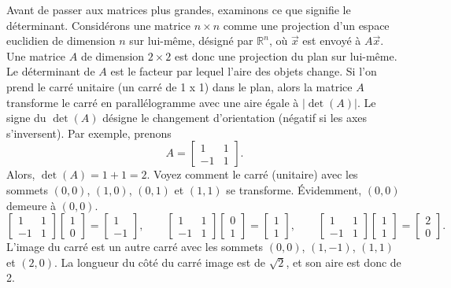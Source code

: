Avant de passer aux matrices plus grandes, examinons ce que signifie le déterminant. Considérons une matrice $n \times n$
comme une projection d'un espace euclidien de dimension $n$ sur lui-même, désigné par ${\mathbb{R}}^n$, où $\vec{x}$ est envoyé à $A \vec{x}$.
Une matrice $A$ de dimension $2 \times 2$ est donc une projection du plan sur lui-même. Le déterminant de 
$A$ est le facteur par lequel l'aire des objets change. Si l'on prend le carré unitaire (un carré de 1 x 1) dans le plan, alors la matrice
$A$ transforme le carré en parallélogramme avec une aire égale à $\lvert\det(A)\rvert$. Le signe
du $\det(A)$ désigne le changement d'orientation (négatif si les axes s'inversent). Par exemple, prenons
\begin{equation*}
A =
\begin{bmatrix}
1 & 1 \\
-1 & 1
\end{bmatrix} .
\end{equation*}
Alors, $\det(A) = 1+1 = 2$. Voyez comment le carré (unitaire) avec les sommets
$(0,0)$, $(1,0)$, $(0,1)$ et $(1,1)$ se transforme. Évidemment, $(0,0)$ demeure à $(0,0)$. 
\begin{equation*}
\begin{bmatrix}
1 & 1 \\
-1 & 1
\end{bmatrix}
\begin{bmatrix}
1 \\ 0
\end{bmatrix} =
\begin{bmatrix}
1 \\
-1 
\end{bmatrix}
,
\qquad
\begin{bmatrix}
1 & 1 \\
-1 & 1
\end{bmatrix}
\begin{bmatrix}
0 \\ 1
\end{bmatrix} =
\begin{bmatrix}
1 \\
1 
\end{bmatrix}
,
\qquad
\begin{bmatrix}
1 & 1 \\
-1 & 1
\end{bmatrix}
\begin{bmatrix}
1 \\ 1
\end{bmatrix} =
\begin{bmatrix}
2 \\
0 
\end{bmatrix}
.
\end{equation*}
L'image du carré est un autre carré avec les sommets $(0,0)$, $(1,-1)$,
$(1,1)$ et $(2,0)$. La longueur du côté du carré image est de $\sqrt{2}$, et son aire est donc de 2.

